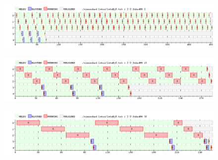 \begin{figure}[H]
  \centering
  \includegraphics[width=1\textwidth]{img/imgEj5-1}
  \caption{}
  \label{fig:ej5-1}
\end{figure}

\begin{figure}[H]
  \centering
  \includegraphics[width=1\textwidth]{img/imgEj5-2}
  \caption{}
  \label{fig:ej5-2}
\end{figure}

\begin{figure}[H]
  \centering
  \includegraphics[width=1\textwidth]{img/imgEj5-3}
  \caption{}
  \label{fig:ej5-3}
\end{figure}